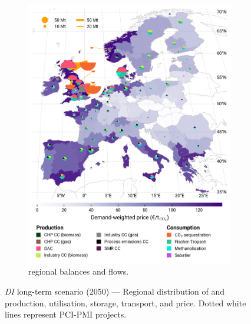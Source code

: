 \documentclass[final,5p,times,twocolumn,sort&compress]{elsarticle}
\begin{document}
\begin{figure}[htbp]
\begin{subfigure}[t]{0.49\textwidth}
      \includegraphics[width=1\textwidth]{maps/no-pipelines-no-pcipmi/base_s_adm___2050-balance_map_co2_stored} 
      \vspace{-0.7cm}
      \caption{ regional balances and flows.}
      \label{fig:DI_lt_2050_co2}
  \end{subfigure}
  \caption{\textit{DI} long-term scenario (2050) --- Regional distribution of  and  production, utilisation, storage, transport, and price. Dotted white lines represent PCI-PMI projects.}
  \label{fig:DI_lt_2050}
\end{figure}
\end{document}
